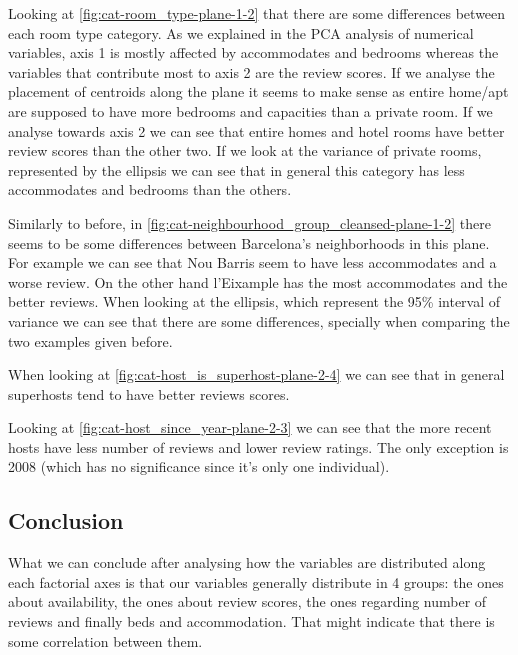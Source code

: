 \begin{landscape}


Looking at \cref{fig:cat-room_type-plane-1-2} that there are some 
differences between each room type category. As we explained in the PCA analysis of numerical variables, axis 1 is mostly affected by accommodates and bedrooms whereas the variables that contribute most to axis 2 are the review scores. If we analyse the
placement of centroids along the plane it seems to make sense as entire home/apt are supposed to have more bedrooms and capacities than a private room. If we analyse towards axis 2 we can see that entire homes and hotel rooms have better review scores than the 
other two. If we look at the variance of private rooms, represented by the ellipsis we 
can see that in general this category has less accommodates and bedrooms than the others.



Similarly to before, in \cref{fig:cat-neighbourhood_group_cleansed-plane-1-2} there seems to be some differences between Barcelona's neighborhoods in this plane. For example we can 
see that Nou Barris seem to have less accommodates and a worse review. On the other
hand l'Eixample has the most accommodates and the better reviews. When looking at
the ellipsis, which represent the 95\% interval of variance we can see that there are
some differences, specially when comparing the two examples given before. 

When looking at \cref{fig:cat-host_is_superhost-plane-2-4} we can
see that in general superhosts tend to have better reviews scores.

Looking at \cref{fig:cat-host_since_year-plane-2-3} we can see that the more recent hosts have less number of
reviews and lower review ratings.
The only exception is 2008 (which has no significance since it's only one individual).

\end{landscape}

\subsection{Conclusion}%
What we can conclude after analysing how the variables are distributed along each factorial axes is 
that our variables generally distribute in 4 groups: the ones about availability,   
the ones about review scores, the ones regarding number of reviews and finally beds and accommodation. That might indicate that there is some correlation between them.

